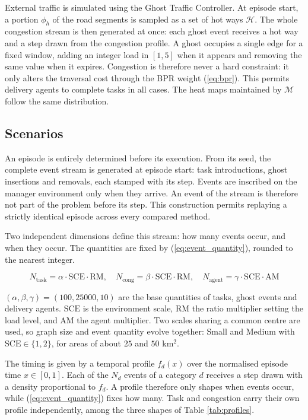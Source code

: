 \documentclass[sigconf]{acmart}
\begin{document}
External traffic is simulated using the Ghost Traffic Controller. At episode start, a portion $\phi_h$ of the road segments is sampled as a set of hot ways $\mathcal{H}$. The whole congestion stream is then generated at once: each ghost event receives a hot way and a step drawn from the congestion profile. A ghost occupies a single edge for a fixed window, adding an integer load in $[1, 5]$ when it appears and removing the same value when it expires. Congestion is therefore never a hard constraint: it only alters the traversal cost through the BPR weight (\ref{eq:bpr}). This permits delivery agents to complete tasks in all cases. The heat maps maintained by $\mathcal{M}$ follow the same distribution.

\subsection{Scenarios}
\label{sec:scenarios}

An episode is entirely determined before its execution. From its seed, the complete event stream is generated at episode start: task introductions, ghost insertions and removals, each stamped with its step. Events are inscribed on the manager environment only when they arrive. An event of the stream is therefore not part of the problem before its step. This construction permits replaying a strictly identical episode across every compared method.

Two independent dimensions define this stream: how many events occur, and when they occur. The quantities are fixed by (\ref{eq:event_quantity}), rounded to the nearest integer.

\begin{equation}
N_{\mathrm{task}} = \alpha \cdot \mathrm{SCE} \cdot \mathrm{RM}, \quad
N_{\mathrm{cong}} = \beta \cdot \mathrm{SCE} \cdot \mathrm{RM}, \quad
N_{\mathrm{agent}} = \gamma \cdot \mathrm{SCE} \cdot \mathrm{AM}
\label{eq:event_quantity}
\end{equation}

$(\alpha, \beta, \gamma) = (100, 25000, 10)$ are the base quantities of tasks, ghost events and delivery agents. $\mathrm{SCE}$ is the environment scale, $\mathrm{RM}$ the ratio multiplier setting the load level, and $\mathrm{AM}$ the agent multiplier. Two scales sharing a common centre are used, so graph size and event quantity evolve together: Small and Medium with $\mathrm{SCE} \in \{1, 2\}$, for areas of about $25$ and $50$ km$^2$.

The timing is given by a temporal profile $f_d(x)$ over the normalised episode time $x \in [0,1]$. Each of the $N_d$ events of a category $d$ receives a step drawn with a density proportional to $f_d$. A profile therefore only shapes when events occur, while (\ref{eq:event_quantity}) fixes how many. Task and congestion carry their own profile independently, among the three shapes of Table \ref{tab:profiles}.
\end{document}
